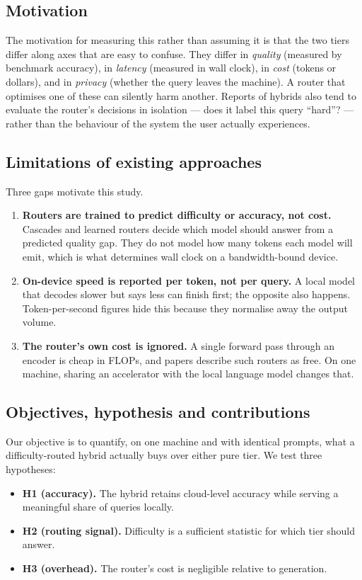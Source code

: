 \documentclass[11pt,a4paper]{article}
\begin{document}
\subsection{Motivation}
The motivation for measuring this rather than assuming it is that the two
tiers differ along axes that are easy to confuse. They differ in \emph{quality}
(measured by benchmark accuracy), in \emph{latency} (measured in wall clock), in
\emph{cost} (tokens or dollars), and in \emph{privacy} (whether the query leaves
the machine). A router that optimises one of these can silently harm another.
Reports of hybrids also tend to evaluate the router's decisions in isolation
--- does it label this query ``hard''? --- rather than the behaviour of the
system the user actually experiences.

\subsection{Limitations of existing approaches}
Three gaps motivate this study.
\begin{enumerate}
\item \textbf{Routers are trained to predict difficulty or accuracy, not cost.}
Cascades and learned routers \cite{frugalgpt,routellm,hybridllm,automix}
decide which model should answer from a predicted quality gap. They do not
model how many tokens each model will emit, which is what determines wall
clock on a bandwidth-bound device.
\item \textbf{On-device speed is reported per token, not per query.} A local
model that decodes slower but says less can finish first; the opposite also
happens. Token-per-second figures hide this because they normalise away the
output volume.
\item \textbf{The router's own cost is ignored.} A single forward pass through
an encoder is cheap in FLOPs, and papers describe such routers as free. On one
machine, sharing an accelerator with the local language model changes that.
\end{enumerate}

\subsection{Objectives, hypothesis and contributions}
Our objective is to quantify, on one machine and with identical prompts, what a
difficulty-routed hybrid actually buys over either pure tier. We test three
hypotheses:
\begin{itemize}
\item \textbf{H1 (accuracy).} The hybrid retains cloud-level accuracy while
serving a meaningful share of queries locally.
\item \textbf{H2 (routing signal).} Difficulty is a sufficient statistic for
which tier should answer.
\item \textbf{H3 (overhead).} The router's cost is negligible relative to
generation.
\end{itemize}
\end{document}
